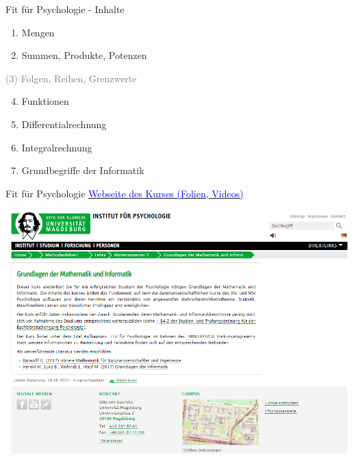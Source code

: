 \documentclass[
  8pt,
  ignorenonframetext,
  t]{beamer}
\begin{document}
\begin{frame}{Fit für Psychologie - Inhalte}
\protect\hypertarget{fit-fuxfcr-psychologie---inhalte}{}
\large
\vfill

\begin{enumerate}
[(1)]
\item
  Mengen
\item
  Summen, Produkte, Potenzen
\end{enumerate}

\textcolor{gray}{(3) Folgen, Reihen, Grenzwerte}

\begin{enumerate}
[(1)]
\setcounter{enumi}{3}
\item
  Funktionen
\item
  Differentialrechnung
\item
  Integralrechnung
\item
  Grundbegriffe der Informatik \vfill
\end{enumerate}
\end{frame}

\begin{frame}{Fit für Psychologie}
\protect\hypertarget{fit-fuxfcr-psychologie}{}
\href{https://www.ipsy.ovgu.de/Institut/Abteilungen+des+Institutes/Methodenlehre+I+_+Experimentelle+und+Neurowissenschaftliche+Psychologie/Lehre/Wintersemester+2022/Grundlagen+der+Mathematik+und+Informatik.html}{\textcolor{blue}{Webseite des Kurses (Folien, Videos)}}

\vspace{5mm}

\begin{center}\includegraphics[width=0.75\linewidth]{../Abbildungen/glmi_0_kursseite} \end{center}
\color{red}{TODO: git einfügen?}
\end{frame}
\end{document}
